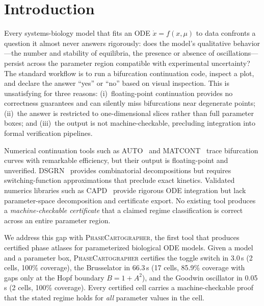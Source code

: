 \documentclass[11pt]{article}
\newcommand{\PC}{\textsc{PhaseCartographer}}
\begin{document}
\section{Introduction}
\label{sec:intro}

Every systems-biology model that fits an ODE $\dot{x} = f(x, \mu)$ to data confronts a question it almost never answers rigorously: does the model's qualitative behavior---the number and stability of equilibria, the presence or absence of oscillations---persist across the parameter region compatible with experimental uncertainty?
The standard workflow is to run a bifurcation continuation code, inspect a plot, and declare the answer ``yes'' or ``no'' based on visual inspection.
This is unsatisfying for three reasons: (i)~floating-point continuation provides no correctness guarantees and can silently miss bifurcations near degenerate points; (ii)~the answer is restricted to one-dimensional slices rather than full parameter boxes; and (iii)~the output is not machine-checkable, precluding integration into formal verification pipelines.

Numerical continuation tools such as AUTO~\cite{doedel2007auto} and MATCONT~\cite{dhooge2008matcont} trace bifurcation curves with remarkable efficiency, but their output is floating-point and unverified.
DSGRN~\cite{cummins2016dsgrn} provides combinatorial decompositions but requires switching-function approximations that preclude exact kinetics.
Validated numerics libraries such as CAPD~\cite{kapela2021capd} provide rigorous ODE integration but lack parameter-space decomposition and certificate export.
No existing tool produces a \emph{machine-checkable certificate} that a claimed regime classification is correct across an entire parameter region.

We address this gap with \PC{}, the first tool that produces certified phase atlases for parameterized biological ODE models.
Given a model and a parameter box, \PC{} certifies the toggle switch in 3.0\,s (2 cells, 100\% coverage), the Brusselator in 66.3\,s (17 cells, 85.9\% coverage with gaps only at the Hopf boundary $B = 1 + A^2$), and the Goodwin oscillator in 0.05\,s (2 cells, 100\% coverage).
Every certified cell carries a machine-checkable proof that the stated regime holds for \emph{all} parameter values in the cell.
\end{document}
